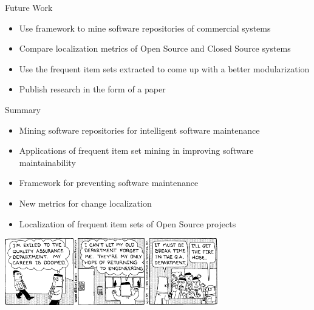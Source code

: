\begin{frame}{Future Work}
  \begin{itemize}
  \item Use framework to mine software repositories of commercial
    systems
  \item Compare localization metrics of Open Source and Closed Source
    systems
  \item Use the frequent item sets extracted to come up with a better
    modularization
  \item Publish research in the form of a paper
  \end{itemize}
\end{frame}

\note{
}

\begin{frame}{Summary}
  \begin{itemize}
  \item Mining software repositories for intelligent
    software maintenance
  \item Applications of frequent item set mining in improving software
    maintainability
  \item Framework for preventing software maintenance
  \item New metrics for change localization
  \item Localization of frequent item sets of Open Source projects
  \end{itemize}


  \begin{center}
    \includegraphics[width=0.7\textwidth]{figures/dilbert-quality-assurance}
  \end{center}
\end{frame}



